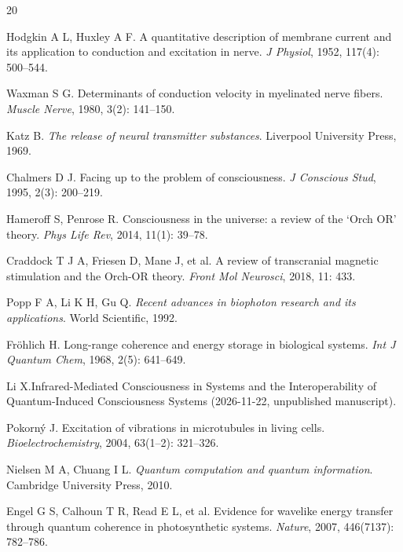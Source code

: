 \documentclass[11pt,a4paper]{article}
\begin{document}

\begin{thebibliography}{20}

Hodgkin A L, Huxley A F. A quantitative description of membrane current and its application to conduction and excitation in nerve. \textit{J Physiol}, 1952, 117(4): 500--544.

Waxman S G. Determinants of conduction velocity in myelinated nerve fibers. \textit{Muscle Nerve}, 1980, 3(2): 141--150.

Katz B. \textit{The release of neural transmitter substances}. Liverpool University Press, 1969.

Chalmers D J. Facing up to the problem of consciousness. \textit{J Conscious Stud}, 1995, 2(3): 200--219.

Hameroff S, Penrose R. Consciousness in the universe: a review of the `Orch OR' theory. \textit{Phys Life Rev}, 2014, 11(1): 39--78.

Craddock T J A, Friesen D, Mane J, et al. A review of transcranial magnetic stimulation and the Orch-OR theory. \textit{Front Mol Neurosci}, 2018, 11: 433.

Popp F A, Li K H, Gu Q. \textit{Recent advances in biophoton research and its applications}. World Scientific, 1992.

Fr\"{o}hlich H. Long-range coherence and energy storage in biological systems. \textit{Int J Quantum Chem}, 1968, 2(5): 641--649.

Li X.Infrared-Mediated Consciousness in Systems and the
Interoperability of Quantum-Induced Consciousness
Systems (2026-11-22, unpublished manuscript).

Pokorn\'{y} J. Excitation of vibrations in microtubules in living cells. \textit{Bioelectrochemistry}, 2004, 63(1--2): 321--326.

Nielsen M A, Chuang I L. \textit{Quantum computation and quantum information}. Cambridge University Press, 2010.

Engel G S, Calhoun T R, Read E L, et al. Evidence for wavelike energy transfer through quantum coherence in photosynthetic systems. \textit{Nature}, 2007, 446(7137): 782--786.


\end{thebibliography}
\end{document}
